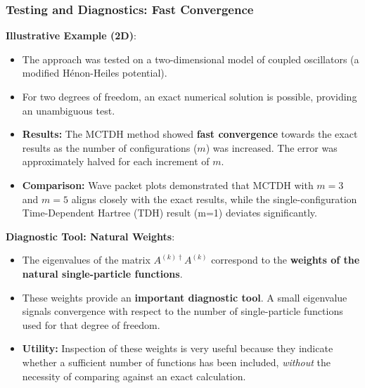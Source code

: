 \begin{frame}
    \frametitle{Testing and Diagnostics: Fast Convergence}
    
    \textbf{Illustrative Example (2D)}:
    \begin{itemize}
        \item The approach was tested on a two-dimensional model of coupled oscillators (a modified Hénon-Heiles potential).
        \item For two degrees of freedom, an exact numerical solution is possible, providing an unambiguous test.
        \item \textbf{Results:} The MCTDH method showed \textbf{fast convergence} towards the exact results as the number of configurations ($m$) was increased. The error was approximately halved for each increment of $m$.
        \item \textbf{Comparison:} Wave packet plots demonstrated that MCTDH with $m=3$ and $m=5$ aligns closely with the exact results, while the single-configuration Time-Dependent Hartree (TDH) result (m=1) deviates significantly.
    \end{itemize}
    \end{frame}
    \begin{frame}
    \textbf{Diagnostic Tool: Natural Weights}:
    \begin{itemize}
        \item The eigenvalues of the matrix $A^{(k)\dagger}A^{(k)}$ correspond to the \textbf{weights of the natural single-particle functions}.
        \item These weights provide an \textbf{important diagnostic tool}. A small eigenvalue signals convergence with respect to the number of single-particle functions used for that degree of freedom.
        \item \textbf{Utility:} Inspection of these weights is very useful because they indicate whether a sufficient number of functions has been included, \textit{without} the necessity of comparing against an exact calculation.
    \end{itemize}
\end{frame}

